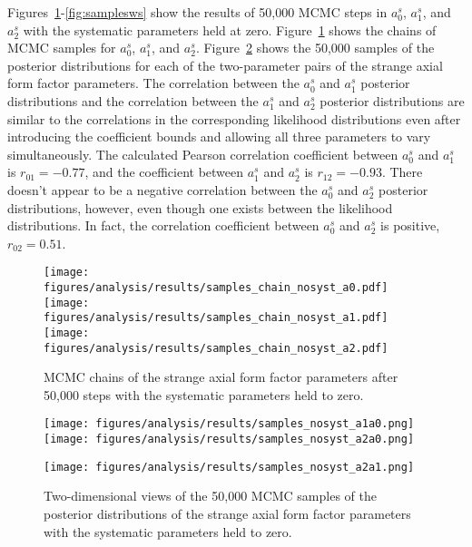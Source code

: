     Figures~\ref{fig:chainns}-\ref{fig:samplesws} show the results of 50,000
    MCMC steps in $a_0^s$, $a_1^s$, and $a_2^s$ with the systematic parameters
    held at zero. Figure~\ref{fig:chainns} shows the chains of MCMC samples for
    $a_0^s$, $a_1^s$, and $a_2^s$. Figure~\ref{fig:samplesns} shows the 50,000
    samples of the posterior distributions for each of the two-parameter pairs
    of the strange axial form factor parameters. The correlation between the
    $a_0^s$ and $a_1^s$ posterior distributions and the correlation between the
    $a_1^s$ and $a_2^s$ posterior distributions are similar to the correlations
    in the corresponding likelihood distributions even after introducing the
    coefficient bounds and allowing all three parameters to vary
    simultaneously. The calculated Pearson correlation coefficient between
    $a_0^s$ and $a_1^s$ is $r_{01} = -0.77$, and the coefficient between
    $a_1^s$ and $a_2^s$ is $r_{12} = -0.93$. There doesn't appear to be a
    negative correlation between the $a_0^s$ and $a_2^s$ posterior
    distributions, however, even though one exists between the likelihood
    distributions. In fact, the correlation coefficient between $a_0^s$ and
    $a_2^s$ is positive, $r_{02} = 0.51$.
    \begin{figure}[h]
      \centering
      \texttt{[image: figures/analysis/results/samples\_chain\_nosyst\_a0.pdf]} \\
      \texttt{[image: figures/analysis/results/samples\_chain\_nosyst\_a1.pdf]} \\
      \texttt{[image: figures/analysis/results/samples\_chain\_nosyst\_a2.pdf]}
      \caption{MCMC chains of the strange axial form factor parameters after
      50,000 steps with the systematic parameters held to zero.}
      \label{fig:chainns}
    \end{figure}
    \begin{figure}[h]
      \texttt{[image: figures/analysis/results/samples\_nosyst\_a1a0.png]}
      \hspace{2pt}
      \texttt{[image: figures/analysis/results/samples\_nosyst\_a2a0.png]}
      \begin{flushright}
      \texttt{[image: figures/analysis/results/samples\_nosyst\_a2a1.png]}
      \end{flushright} 
      \caption{Two-dimensional views of the 50,000 MCMC samples of the
      posterior distributions of the strange axial form factor parameters with
      the systematic parameters held to zero.}
      \label{fig:samplesns}
    \end{figure}
  

